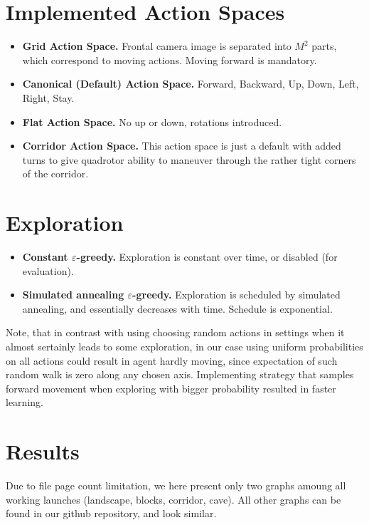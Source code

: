 \documentclass{article}
\begin{document}
\section{Implemented Action Spaces}

\begin{itemize}
    \item {\bf Grid Action Space.} Frontal camera image is separated into $M^2$ parts, which correspond to moving actions. Moving forward is mandatory.
    \item {\bf Canonical (Default) Action Space.} Forward, Backward, Up, Down, Left, Right, Stay.
    \item {\bf Flat Action Space.} No up or down, rotations introduced.
    \item {\bf Corridor Action Space.} This action space is just a default with added turns to give quadrotor ability to maneuver through the rather tight corners of the corridor. 
\end{itemize}

\section{Exploration}

\begin{itemize}
    \item {\bf Constant $\varepsilon$-greedy.} Exploration is constant over time, or disabled (for evaluation).
    \item {\bf Simulated annealing $\varepsilon$-greedy.} Exploration is scheduled by simulated annealing, and essentially decreases with time.
        Schedule is exponential.
\end{itemize}

Note, that in contrast with using choosing random actions in settings when it almost sertainly leads to some exploration, in our case using uniform probabilities on all actions could result in agent hardly moving, since expectation of such random walk is zero along any chosen axis. Implementing strategy that samples forward movement when exploring with bigger probability resulted in faster learning.  

\section{Results}

Due to file page count limitation, we here present 
only two graphs amoung all working launches (landscape, blocks, corridor, cave).
All other graphs can be found in our github repository, and look similar.
\end{document}
